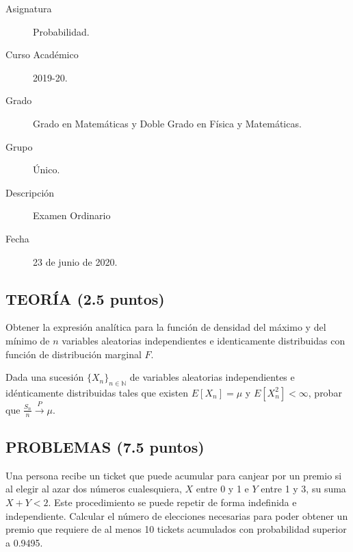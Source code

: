 \documentclass[12pt]{article}
\begin{document}

    
    

    \begin{description}
        \item[Asignatura] Probabilidad.
        \item[Curso Académico] 2019-20.
        \item[Grado] Grado en Matemáticas y Doble Grado en Física y Matemáticas.
        \item[Grupo] Único.
        \item[Descripción] Examen Ordinario 
        \item[Fecha] 23 de junio de 2020.
    
    \end{description}
    \newpage

    \subsection*{TEORÍA (2.5 puntos)}
    \begin{ejercicio}
        Obtener la expresión analítica para la función de densidad del máximo y del mínimo de $n$ variables aleatorias independientes e identicamente distribuidas con función de distribución marginal $F$.
    \end{ejercicio}

    \begin{ejercicio}
        Dada una sucesión $\{X_n\}_{n\in \mathbb{N}}$ de variables aleatorias independientes e idénticamente distribuidas tales que existen $E[X_n] = \mu$ y $E[X_n^2] < \infty$, probar que $\frac{S_n}{n}\stackrel{P}{\rightarrow} \mu$.
    \end{ejercicio}

    \subsection*{PROBLEMAS (7.5 puntos)}
    \begin{ejercicio}
        Una persona recibe un ticket que puede acumular para canjear por un premio si al elegir al azar dos números cualesquiera, $X$ entre 0 y 1 e $Y$ entre 1 y 3, su suma $X+Y<2$. Este procedimiento se puede repetir de forma indefinida e independiente. Calcular el número de elecciones necesarias para poder obtener un premio que requiere de al menos 10 tickets acumulados con probabilidad superior a 0.9495.
    \end{ejercicio}
\end{document}
